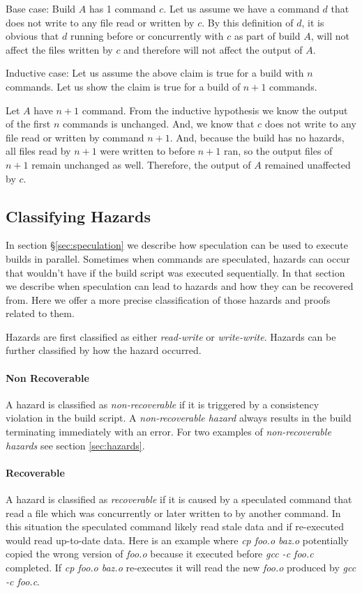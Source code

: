 Base case:  Build $A$ has 1 command $c$.  Let us assume we have a command $d$ that does not write to any file read or written by $c$.  By this definition of $d$, it is obvious that $d$ running before or
concurrently with $c$ as part of build $A$, will not affect the files written by $c$ and therefore will not affect the output of $A$.

Inductive case: Let us assume the above claim is true for a build with $n$ commands.  Let us show the claim is true for a build of $n+1$ commands.

Let $A$ have $n+1$ command.  From the inductive hypothesis we know the output of the first $n$ commands is unchanged.  And, we know that $c$ does not write to any file read or written by command $n+1$.  And, because the build has no hazards, all files read by $n+1$ were written to before $n+1$ ran, so the output files of $n+1$ remain unchanged as well.  Therefore, the output of $A$ remained unaffected by $c$.

\subsection{Classifying Hazards}
\label{sec:proof:classify_hazard}


In section \S\ref{sec:speculation} we describe how speculation can be used to execute builds in parallel.  Sometimes when commands are speculated, hazards can occur that wouldn't have if the build script was executed sequentially.  In that section we describe when speculation can lead to hazards and how they can be recovered from.  Here we offer a more precise classification of those hazards and proofs related to them.

Hazards are first classified as either \emph{read-write} or \emph{write-write}.  Hazards can be further classified by how the hazard occurred.

\paragraph{Non Recoverable}
A hazard is classified as \emph{non-recoverable} if it is triggered by a consistency violation in the build script.  A \emph{non-recoverable hazard} always results in the build terminating immediately with an error.  For two examples of \emph{non-recoverable hazards} see section \ref{sec:hazards}.

\paragraph{Recoverable}
A hazard is classified as \emph{recoverable} if it is caused by a speculated command that read a file which was concurrently or later written to by another command.  In this situation the speculated command likely read stale data and if re-executed would read up-to-date data.  Here is an example where \emph{cp foo.o baz.o} potentially copied the wrong version of \emph{foo.o} because it executed before \emph{gcc -c foo.c} completed.  If \emph{cp foo.o baz.o} re-executes it will read the new \emph{foo.o} produced by \emph{gcc -c foo.c}.

